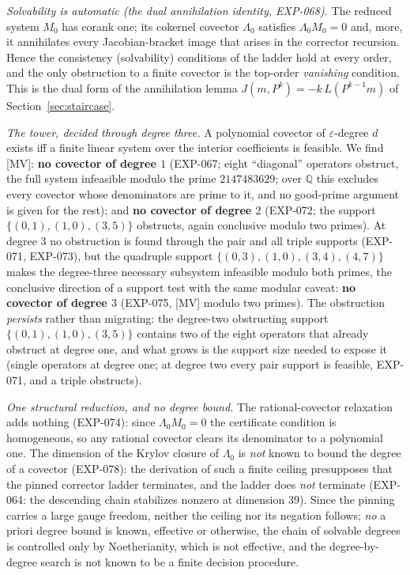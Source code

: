 \documentclass[11pt]{article}
\theoremstyle{remark}
\begin{document}
\emph{Solvability is automatic (the dual annihilation identity, EXP-068).} The
reduced system $M_0$ has corank one; its cokernel covector $\Lambda_0$ satisfies
$\Lambda_0 M_0 = 0$ and, more, it annihilates every Jacobian-bracket image that
arises in the corrector recursion. Hence the consistency (solvability) conditions
of the ladder hold at every order, and the only obstruction to a finite covector
is the top-order \emph{vanishing} condition. This is the dual form of the
annihilation lemma $J(m, P^k) = -k\,L(P^{k-1} m)$ of Section~\ref{sec:staircase}.

\emph{The tower, decided through degree three.} A polynomial covector of
$\varepsilon$-degree $d$ exists iff a finite linear system over the interior
coefficients is feasible. We find [MV]: \textbf{no covector of degree $1$}
(EXP-067; eight ``diagonal'' operators obstruct, the full system infeasible modulo
the prime $2147483629$; over $\mathbb{Q}$ this excludes every covector whose denominators are prime
to it, and no good-prime argument is given for the rest); and \textbf{no covector of
degree $2$} (EXP-072; the support $\{(0,1),(1,0),(3,5)\}$ obstructs, again
conclusive modulo two primes). At degree $3$ no obstruction is found through the
pair and all triple supports (EXP-071, EXP-073), but the quadruple support
$\{(0,3),(1,0),(3,4),(4,7)\}$ makes the degree-three necessary subsystem infeasible modulo both
primes, the conclusive direction of a support test with the same modular caveat: \textbf{no
covector of degree $3$} (EXP-075, [MV] modulo two primes). The
obstruction \emph{persists} rather than migrating: the degree-two obstructing
support $\{(0,1),(1,0),(3,5)\}$ contains two of the eight operators that already
obstruct at degree one, and what grows is the support size needed to expose it
(single operators at degree one; at degree two every pair support is feasible,
EXP-071, and a triple obstructs).

\emph{One structural reduction, and no degree bound.} The rational-covector
relaxation adds nothing (EXP-074): since $\Lambda_0 M_0 = 0$ the certificate
condition is homogeneous, so any rational covector clears its denominator to a
polynomial one. The dimension of the Krylov closure of $\Lambda_0$ is \emph{not}
known to bound the degree of a covector (EXP-078): the derivation of such a finite
ceiling presupposes that the pinned corrector ladder terminates, and the ladder does
\emph{not} terminate (EXP-064: the descending chain stabilizes nonzero at dimension
$39$). Since the pinning carries a large gauge freedom, neither
the ceiling nor its negation follows; \emph{no} a priori degree bound is known,
effective or otherwise, the chain of solvable degrees is controlled only by
Noetherianity, which is not effective, and the degree-by-degree search is not known
to be a finite decision procedure.
\end{document}
